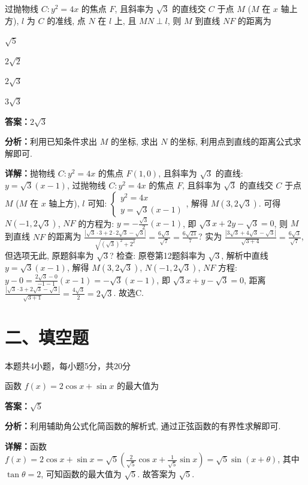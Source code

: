 \begin{question}[points=5]
过抛物线 $C: y^2=4x$ 的焦点 $F$, 且斜率为 $\sqrt{3}$ 的直线交 $C$ 于点 $M$ ($M$ 在 $x$ 轴上方), $l$ 为 $C$ 的准线, 点 $N$ 在 $l$ 上, 且 $MN\perp l$, 则 $M$ 到直线 $NF$ 的距离为
\begin{choices}
  \item $\sqrt{5}$
  \item $2\sqrt{2}$
  \item $2\sqrt{3}$
  \item $3\sqrt{3}$
\end{choices}
\begin{solution}
\textbf{答案：}$2\sqrt{3}$

\textbf{分析：}利用已知条件求出 $M$ 的坐标, 求出 $N$ 的坐标, 利用点到直线的距离公式求解即可.

\textbf{详解：}抛物线 $C: y^2=4x$ 的焦点 $F(1,0)$, 且斜率为 $\sqrt{3}$ 的直线: $y=\sqrt{3}(x-1)$, 过抛物线 $C: y^2=4x$ 的焦点 $F$, 且斜率为 $\sqrt{3}$ 的直线交 $C$ 于点 $M$ ($M$ 在 $x$ 轴上方), $l$ 可知: $\begin{cases} y^2=4x\\ y=\sqrt{3}(x-1) \end{cases}$, 解得 $M(3,2\sqrt{3})$. 可得 $N(-1,2\sqrt{3})$, $NF$ 的方程为: $y=-\frac{\sqrt{3}}{2}(x-1)$, 即 $\sqrt{3}x+2y-\sqrt{3}=0$, 则 $M$ 到直线 $NF$ 的距离为 $\frac{|\sqrt{3}\cdot3+2\cdot2\sqrt{3}-\sqrt{3}|}{\sqrt{(\sqrt{3})^2+2^2}}=\frac{6\sqrt{3}}{\sqrt{7}}=\frac{6\sqrt{21}}{7}$? 实为 $\frac{|3\sqrt{3}+4\sqrt{3}-\sqrt{3}|}{\sqrt{3+4}}=\frac{6\sqrt{3}}{\sqrt{7}}$, 但选项无此, 原题斜率为 $\sqrt{3}$? 检查: 原卷第12题斜率为 $\sqrt{3}$, 解析中直线 $y=\sqrt{3}(x-1)$, 解得 $M(3,2\sqrt{3})$, $N(-1,2\sqrt{3})$, $NF$ 方程: $y-0=\frac{2\sqrt{3}-0}{-1-1}(x-1)=-\sqrt{3}(x-1)$, 即 $\sqrt{3}x+y-\sqrt{3}=0$, 距离 $\frac{|\sqrt{3}\cdot3+2\sqrt{3}-\sqrt{3}|}{\sqrt{3+1}}=\frac{4\sqrt{3}}{2}=2\sqrt{3}$. 故选C.
\end{solution}
\end{question}

\section*{二、填空题}
本题共4小题，每小题5分，共20分

\begin{question}[points=5]
函数 $f(x)=2\cos x+\sin x$ 的最大值为
\fillin[{$\sqrt{5}$}]
\begin{solution}
\textbf{答案：}$\sqrt{5}$

\textbf{分析：}利用辅助角公式化简函数的解析式, 通过正弦函数的有界性求解即可.

\textbf{详解：}函数 $f(x)=2\cos x+\sin x=\sqrt{5}\left(\frac{2}{\sqrt{5}}\cos x+\frac{1}{\sqrt{5}}\sin x\right)=\sqrt{5}\sin(x+\theta)$, 其中 $\tan\theta=2$, 可知函数的最大值为 $\sqrt{5}$. 故答案为 $\sqrt{5}$.
\end{solution}
\end{question}

